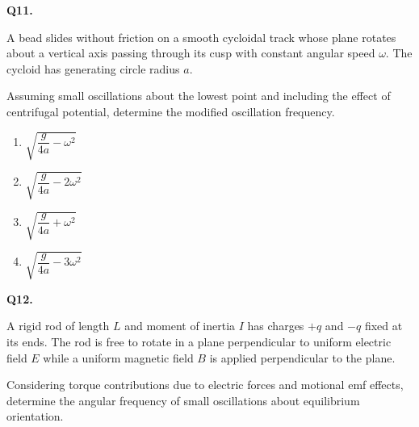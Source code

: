 \documentclass[12pt]{article}
\begin{document}
\bigskip

\textbf{Q11.}

A bead slides without friction on a smooth cycloidal track whose plane rotates about a vertical axis passing through its cusp with constant angular speed $\omega$. The cycloid has generating circle radius $a$.

Assuming small oscillations about the lowest point and including the effect of centrifugal potential, determine the modified oscillation frequency.

\begin{center}
\end{center}

\begin{enumerate}
\item[(A)] $\sqrt{\dfrac{g}{4a}-\omega^2}$
\item[(B)] $\sqrt{\dfrac{g}{4a}-2\omega^2}$
\item[(C)] $\sqrt{\dfrac{g}{4a}+\omega^2}$
\item[(D)] $\sqrt{\dfrac{g}{4a}-3\omega^2}$
\end{enumerate}

\bigskip

\textbf{Q12.}

A rigid rod of length $L$ and moment of inertia $I$ has charges $+q$ and $-q$ fixed at its ends. The rod is free to rotate in a plane perpendicular to uniform electric field $E$ while a uniform magnetic field $B$ is applied perpendicular to the plane.

Considering torque contributions due to electric forces and motional emf effects, determine the angular frequency of small oscillations about equilibrium orientation.

\begin{center}
\end{center}
\end{document}
